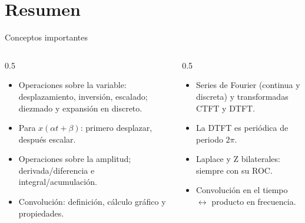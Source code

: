 \documentclass[aspectratio=169,11pt]{beamer}
\begin{document}
\section*{Resumen}
\begin{frame}{Conceptos importantes}
  \begin{columns}[T]
    \begin{column}{0.5\textwidth}
      \begin{itemize}
        \item Operaciones sobre la variable: desplazamiento, inversión, escalado; diezmado y expansión en discreto.
        \item Para $x(\alpha t+\beta)$: primero desplazar, después escalar.
        \item Operaciones sobre la amplitud; derivada/diferencia e integral/acumulación.
        \item \alert{Convolución}: definición, cálculo gráfico y propiedades.
      \end{itemize}
    \end{column}
    \begin{column}{0.5\textwidth}
      \begin{itemize}
        \item Series de Fourier (continua y discreta) y transformadas CTFT y DTFT.
        \item La DTFT es periódica de periodo $2\pi$.
        \item Laplace y Z bilaterales: \alert{siempre con su ROC}.
        \item Convolución en el tiempo $\leftrightarrow$ producto en frecuencia.
      \end{itemize}
    \end{column}
  \end{columns}
  \bigskip
\end{frame}
\end{document}

